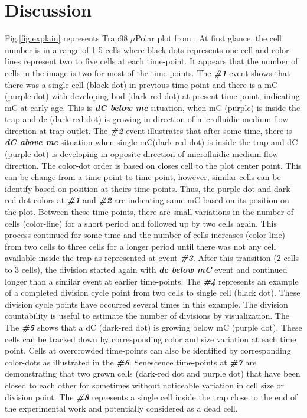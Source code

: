 \documentclass[conference]{IEEEtran}
\begin{document}
\section{Discussion}
Fig.\ref{fig:explain} represents Trap98 $\mu$Polar plot from . At first glance, the cell number is in a range of 1-5 cells where black dots represents one cell and color-lines represent two to five cells at each time-point. It appears that the number of cells in the image is two for most of the time-points. The \textbf{\textit{\#1}} event shows that there was a single cell (block dot) in previous time-point and there is a mC (purple dot) with developing bud (dark-red dot) at present time-point, indicating mC at early age. This is \textbf{\textit{dC below mc}} situation, when mC (purple) is inside the trap and dc (dark-red dot) is growing in direction of microfluidic medium flow direction at trap outlet. The \textbf{\textit{\#2}} event illustrates that after some time, there is \textbf{\textit{dC above mc}} situation when single mC(dark-red dot) is inside the trap and dC (purple dot) is developing in opposite direction of microfluidic medium flow direction. The color-dot order is based on closes cell to the plot center point. This can be change from a time-point to time-point, however, similar cells can be identify based on position at theirs time-points. Thus, the purple dot and dark-red dot colors at \textbf{\textit{\#1}} and \textbf{\textit{\#2}} are indicating same mC based on its position on the plot. Between these time-points, there are small variations in the number of cells (color-line) for a short period and followed up by two cells again. This process continued for some time and the number of cells increases (color-line) from two cells to three cells for a longer period until there was not any cell available inside the trap as represented at event \textbf{\textit{\#3}}. After this transition (2 cells to 3 cells), the division started again with \textbf{\textit{dc below mC}} event and continued longer than a similar event at earlier time-points. The \textbf{\textit{\#4}} represents an example of a completed division cycle point from two cells to single cell (black dot). These division cycle points have occurred several times in this example. The division countability  is useful to estimate the number of divisions by visualization. The The \textbf{\textit{\#5}} shows that a dC (dark-red dot) is growing below mC (purple dot). These cells can be tracked down by corresponding color and size variation at each time point.   Cells at overcrowded time-points can also be identified by corresponding color-dots as illustrated in the \textbf{\textit{\#6}}. Senescence time-points at \textbf{\textit{\#7}} are demonstrating that two grown cells (dark-red dot and purple dot) that have been closed to each other for sometimes without noticeable variation in cell size or division point. The \textbf{\textit{\#8}} represents a single cell inside the trap close to the end of the experimental work and potentially considered as a dead cell. 
\end{document}
